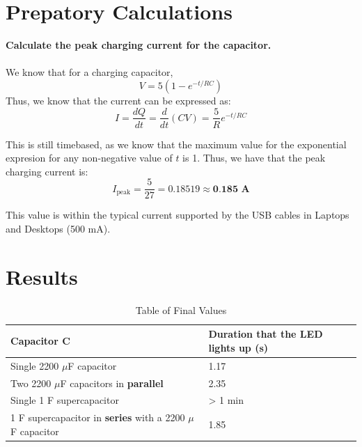 \documentclass[a4paper,12pt,oneside, tikz]{book}
\begin{document}
\section{Prepatory Calculations}

\begin{tcolorbox}
    \textbf{Calculate the peak charging current for the capacitor.} \\
    \\
    We know that for a charging capacitor,
    $$V = 5(1 - e^{-t/RC})$$
    Thus, we know that the current can be expressed as:
    $$I = \frac{dQ}{dt} = \frac{d}{dt} \left(CV \right) = \frac{5}{R} e^{-t/RC}$$

    This is still timebased, as we know that the maximum value for the exponential expresion for any non-negative value of $t$ is 1. Thus, we have that the peak charging current is:
    $$I_\text{peak} = \frac{5}{27} = 0.18519 \approx \textbf{0.185 A}$$

    This value is within the typical current supported by the USB cables in Laptops and Desktops (500 mA).
\end{tcolorbox}

\section{Results}
\begin{table}[H]
    \centering
    \begin{tabular}{|P{70mm}|P{40mm}|}
        \hline Capacitor C & Duration that the LED lights up (s) \\
        \hline Single 2200 $\mu$F capacitor & 1.17  \\
        \hline Two 2200 $\mu$F capacitors in \textbf{parallel} & 2.35 \\
        \hline Single 1 F supercapacitor & > 1 min \\
         F supercapacitor in \textbf{series} with a 2200 $\mu$F capacitor & 1.85 \\
        \hline
    \end{tabular}
    \caption{Table of Final Values}
    \label{tab:final}
\end{table}
\end{document}
